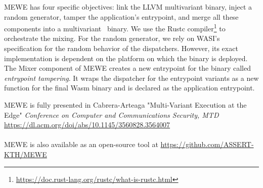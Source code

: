 
MEWE has four specific objectives: link the LLVM multivariant binary, inject a random generator, tamper the application's entrypoint, and merge all these components into a multivariant \wasm\ binary.
We use the Rustc compiler\footnote{\url{https://doc.rust-lang.org/rustc/what-is-rustc.html}} to orchestrate the mixing.
For the random generator, we rely on WASI's specification \cite{WASI} for the random behavior of the dispatchers. 
However, its exact implementation is dependent on the platform on which the binary is deployed.
The Mixer component of MEWE creates a new entrypoint for the binary called \emph{entrypoint tampering}.
It wraps the dispatcher for the entrypoint variants as a new function for the final Wasm binary and is declared as the application entrypoint. 


\begin{tcolorbox}[title=Contribution paper and artifact,boxrule=1pt,arc=.2em,boxsep=1.0mm]
  MEWE is fully presented in Cabrera-Arteaga \etal "Multi-Variant Execution at the Edge"
  \emph{Conference on Computer and Communications Security, MTD}
 \url{https://dl.acm.org/doi/abs/10.1145/3560828.3564007}
 \\\\
 MEWE is also available as an open-source tool at \url{https://github.com/ASSERT-KTH/MEWE}
\end{tcolorbox}